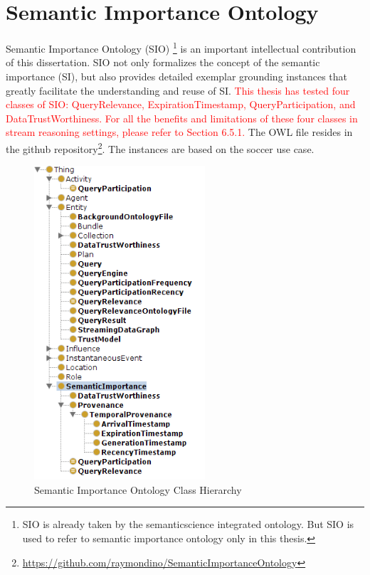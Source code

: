  
\appendix    %

\chapter{Semantic Importance Ontology}
Semantic Importance Ontology (SIO) \footnote{SIO is already taken by the semanticscience integrated ontology. But SIO is used to refer to semantic importance ontology only in this thesis.} is an important intellectual contribution of this dissertation. 
SIO not only formalizes the concept of the semantic importance (SI), but also provides detailed exemplar grounding instances that greatly facilitate the understanding and reuse of SI. 
\textcolor{red}{
This thesis has tested four classes of SIO: QueryRelevance, ExpirationTimestamp, QueryParticipation, and DataTrustWorthiness.
For all the benefits and limitations of these four classes in stream reasoning settings, please refer to Section 6.5.1.
}
The OWL file resides in the github repository\footnote{\url{https://github.com/raymondino/SemanticImportanceOntology}}.
The instances are based on the soccer use case.

\begin{figure}[!htbp]
    \centering
    \includegraphics[width=2.5in]{img/app-sio.png}
    \caption{Semantic Importance Ontology Class Hierarchy}
    \label{fig:app-sio}
\end{figure}

